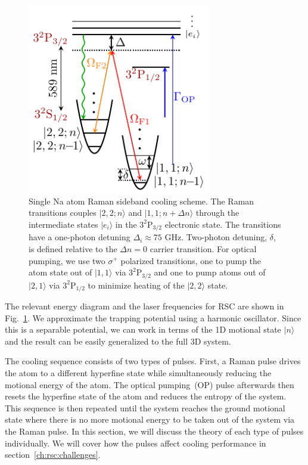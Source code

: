 \begin{figure}
  \centering
  \includegraphics[width=8cm]{figures/na_rsc_schematics.pdf}
  \caption[Schematics of Raman sideband cooling for Sodium.]{
    Single Na atom Raman sideband cooling scheme.
    The Raman transitions couples $|2,2;n\rangle$ and $|1,1;n+\Delta n\rangle$
    through the intermediate states $|e_i\rangle$ in the $\mathrm{3^2P_{3/2}}$ electronic state.
    The transitions have a one-photon detuning $\Delta_i\approx75$ GHz.
    Two-photon detuning, $\delta$, is defined relative to the $\Delta n=0$ carrier transition.
    For optical pumping, we use two $\sigma^+$ polarized transitions,
    one to pump the atom state out of $|1,1\rangle$ via $\mathrm{3^2P_{3/2}}$
    and one to pump atoms out of $|2,1\rangle$ via $\mathrm{3^2P_{1/2}}$
    to minimize heating of the $|2,2\rangle$ state.
    \label{fig:rsc:na-schematics}}
\end{figure}

The relevant energy diagram and the laser frequencies for RSC are shown in
Fig.~\ref{fig:rsc:na-schematics}.
We approximate the trapping potential using a harmonic oscillator.
Since this is a separable potential, we can work in terms of the 1D motional state $|n\rangle$
and the result can be easily generalized to the full 3D system.

The cooling sequence consists of two types of pulses.
First, a Raman pulse drives the atom to a different hyperfine state while simultaneously
reducing the motional energy of the atom.
The optical pumping~(OP) pulse afterwards then resets the hyperfine state of the atom
and reduces the entropy of the system.
This sequence is then repeated until the system reaches the ground motional state
where there is no more motional energy to be taken out of the system via the Raman pulse.
In this section, we will discuss the theory of each type of pulses individually.
We will cover how the pulses affect cooling performance in section~\ref{ch:rsc:challenges}.

